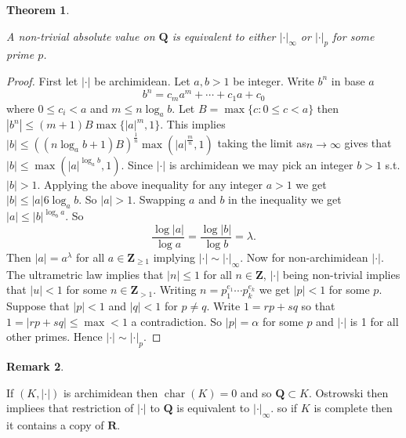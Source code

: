 \documentclass[10pt,]{book}
\newcommand{\lt}{<}
\newcommand{\gt}{>}
\theoremstyle{plain}
\newtheorem{theorem}{Theorem}[section]
\theoremstyle{definition}
\newtheorem{remark}[theorem]{Remark}
\newcommand{\QQ}{\mathbf{Q}}
\newcommand{\RR}{\mathbf{R}}
\newcommand{\ZZ}{\mathbf{Z}}
\newcommand{\ab}{|\cdot|}
\DeclareMathOperator{\chara}{char}
\begin{document}
\begin{theorem}\label{theorem-1}

          A non-trivial absolute value on \(\QQ\) is equivalent to either \(\ab_\infty\) or \(\ab_p\) for some prime \(p\).
        \end{theorem}
\begin{proof}

          First let \(\ab\) be archimidean.
          Let \(a,b\gt 1\) be integer.
          Write \(b^n\) in base \(a\)\[b^n = c_m a^m + \cdots + c_1a + c_0\]
          where \(0\le c_i\lt a\) and \(m\le n\log_a b\).
          Let \(B= \max\{c : 0 \le c \lt a\}\) then \(|b^n| \le (m+1)B \max\{|a|^m,1\}\).
          This implies \(|b| \le ((n\log_a b + 1)B)^{\frac{1}{n}}\max(|a|^{\frac{m}{n}}, 1)\) taking the limit as\(n \to \infty\) gives that \(|b| \le \max(|a|^{\log_a b}, 1)\).
          Since \(\ab\) is archimidean we may pick an integer \(b\gt 1\) s.t. \(|b| \gt 1\).
          Applying the above inequality for any integer \(a \gt 1\) we get \(|b| \le |a|6{\log_a b}\).
          So \(|a| \gt 1\).
          Swapping \(a\) and \(b\) in the inequality we get \(|a| \le |b|^{\log_b a}\).
          So \[\frac{\log|a|}{\log a} = \frac{\log|b|}{\log b} = \lambda.\]
          Then \(|a| = a^{\lambda}\) for all \(a\in \ZZ_{\ge 1}\) implying \(\ab \sim \ab_\infty\).
          \newline{}
          Now for non-archimidean \(\ab\).
          The ultrametric law implies that \(|n| \le 1\) for all \(n\in \ZZ\),
          \(\ab\) being non-trivial implies that \(|u| \lt 1\) for some \(n\in \ZZ_{\gt 1}\).
          Writing \(n = p_1^{e_1}\cdots p_k^{e_k}\) we get \(|p| \lt 1\) for some \(p\).
          Suppose that \(|p| \lt 1\) and \(|q| \lt 1\) for \(p\ne q\).
          Write \(1 = rp + sq\) so that \(1 = |rp + sq| \le \max \lt 1\) a contradiction.
          So \(|p| =\alpha \) for some \(p\) and \(\ab\) is 1 for all other primes.
          Hence \(\ab \sim\ab_p\).
        \end{proof}
\begin{remark}\label{remark-3}

          If \((K,\ab)\) is archimidean then \(\chara(K) = 0\) and so \(\QQ \subset K\).
          Ostrowski  then impliees that restriction of \(\ab\) to \(\QQ\) is equivalent to \(\ab_\infty\).
          so if \(K\) is complete then it contains a copy of \(\RR\).
        \end{remark}
\par
\end{document}
